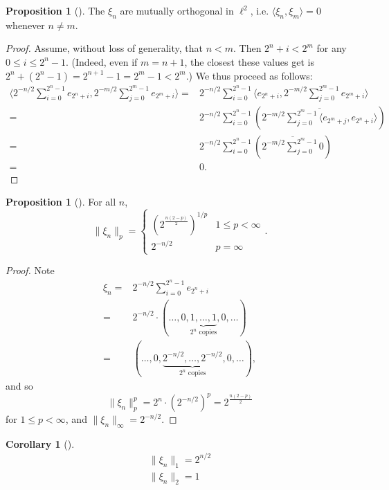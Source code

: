\documentclass{dcthesis}
\numberwithin{equation}{section}
\numberwithin{equation}{section}
\theoremstyle{definition}
\newtheorem{proposition}[equation]{Proposition}
\newtheorem{corollary}[equation]{Corollary}
\begin{document}
\begin{proposition}[]
	The $\xi_n$ are mutually orthogonal in $\ell^2$, i.e. $\langle \xi_n,\xi_m \rangle=0$ whenever $n\neq m$.
\end{proposition}
\begin{proof}
	Assume, without loss of generality, that $n<m$. Then $2^n+i<2^m$ for any $0\leq i \leq 2^n-1$. (Indeed, even if $m=n+1$, the closest these values get is $2^n+(2^n-1)=2^{n+1}-1=2^m-1<2^m$.) We thus proceed as follows: 
	\begin{align*}
		\langle 2^{-n/2}\sum_{i=0}^{2^n-1}e_{2^n+i}, 2^{-m/2}\sum_{j=0}^{2^m-1}e_{2^m+i} \rangle 
		=& 2^{-n/2}\sum_{i=0}^{2^n-1} \langle e_{2^n+i}, 2^{-m/2}\sum_{j=0}^{2^m-1}e_{2^m+i} \rangle \\
		=& 2^{-n/2}\sum_{i=0}^{2^n-1} \left( \overline{ 2^{-m/2}\sum_{j=0}^{2^m-1} \langle e_{2^m+j}, e_{2^n+i} \rangle } \right) \\
		=& 2^{-n/2}\sum_{i=0}^{2^n-1} \left( \overline{ 2^{-m/2}\sum_{j=0}^{2^m-1} 0 } \right) \\
		=& 0.
	\end{align*}
\end{proof}

\begin{proposition}[]
	For all $n$,
	\begin{equation*}
		\|\xi_n\|_p = 
		\begin{cases}
			\left( 2^{\frac{n(2-p)}{2}} \right)^{1/p} & 1\leq p < \infty \\
			2^{-n/2} & p=\infty
		\end{cases}.
	\end{equation*}
\end{proposition}

\begin{proof}
	Note 
	\begin{align*}
		\xi_n =& 2^{-n/2}\sum_{i=0}^{2^n-1}e_{2^n+i} \\
		=& 2^{-n/2}\cdot (\dots, 0, \underbrace{1,\dots,1}_{2^n\text{ copies}}, 0,\dots) \\
		=& (\dots, 0, \underbrace{2^{-n/2},\dots,2^{-n/2}}_{2^n\text{ copies}}, 0,\dots),
	\end{align*}
	and so 
	\begin{equation*}
		\|\xi_n\|_p^p = 2^n\cdot (2^{-n/2})^p = 2^{\frac{n(2-p)}{2}}
	\end{equation*}
	for $1\leq p < \infty$, and $\|\xi_n\|_\infty=2^{-n/2}$.
\end{proof}

\begin{corollary}[]
	\begin{gather*}
		\|\xi_n\|_1 = 2^{n/2} \\
		\|\xi_n\|_2 = 1 \\
	\end{gather*}
\end{corollary}
\end{document}
